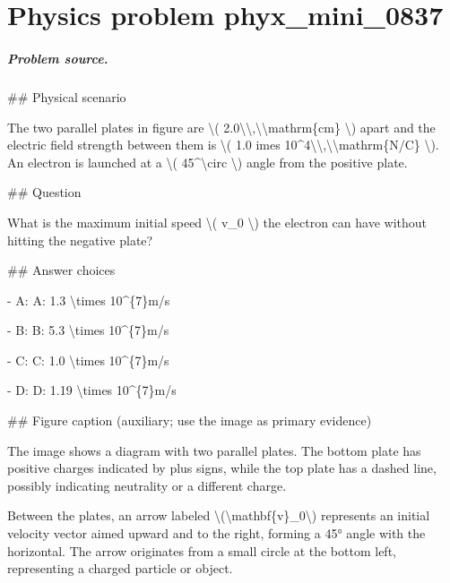 
\chapter{Physics problem phyx\_mini\_0837}
\label{ch:PhyXMiniProblems_problem_phyx_mini_0837}

\paragraph{Problem source.}
\#\# Physical scenario

The two parallel plates in figure are \textbackslash{}( 2.0\textbackslash{}\textbackslash{},\textbackslash{}\textbackslash{}mathrm\{cm\} \textbackslash{}) apart and the electric field strength between them is \textbackslash{}( 1.0 	imes 10\textasciicircum{}4\textbackslash{}\textbackslash{},\textbackslash{}\textbackslash{}mathrm\{N/C\} \textbackslash{}). An electron is launched at a \textbackslash{}( 45\textasciicircum{}\textbackslash{}circ \textbackslash{}) angle from the positive plate.

\#\# Question

What is the maximum initial speed \textbackslash{}( v\_0 \textbackslash{}) the electron can have without hitting the negative plate?

\#\# Answer choices

- A: A: 1.3 \textbackslash{}times 10\textasciicircum{}\{7\}m/s

- B: B: 5.3 \textbackslash{}times 10\textasciicircum{}\{7\}m/s

- C: C: 1.0 \textbackslash{}times 10\textasciicircum{}\{7\}m/s

- D: D: 1.19 \textbackslash{}times 10\textasciicircum{}\{7\}m/s

\#\# Figure caption (auxiliary; use the image as primary evidence)

The image shows a diagram with two parallel plates. The bottom plate has positive charges indicated by plus signs, while the top plate has a dashed line, possibly indicating neutrality or a different charge.

Between the plates, an arrow labeled \textbackslash{}(\textbackslash{}mathbf\{v\}\_0\textbackslash{}) represents an initial velocity vector aimed upward and to the right, forming a 45° angle with the horizontal. The arrow originates from a small circle at the bottom left, representing a charged particle or object.

